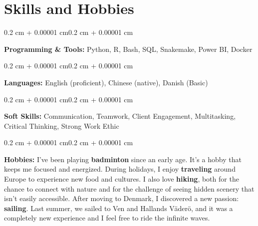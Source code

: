 \documentclass[10pt, letterpaper]{article}
\newenvironment{onecolentry}{
    \begin{adjustwidth}{0.2 cm + 0.00001 cm}{0.2 cm + 0.00001 cm}
}{
    \end{adjustwidth}
}
\begin{document}
    \section{Skills and Hobbies}

        \begin{onecolentry}
            \textbf{Programming \& Tools:} Python, R, Bash, SQL, Snakemake, Power BI, Docker
        \end{onecolentry}

        \vspace{0.2 cm}

        \begin{onecolentry}
            \textbf{Languages:} English (proficient), Chinese (native), Danish (Basic)
        \end{onecolentry}

        \vspace{0.2 cm}

        \begin{onecolentry}
            \textbf{Soft Skills:} Communication, Teamwork, Client Engagement, Multitasking, Critical Thinking, Strong Work Ethic
        \end{onecolentry}

        \vspace{0.2 cm}

        \begin{onecolentry}
            \textbf{Hobbies:}
            I've been playing \textbf{badminton} since an early age. It's a hobby that keeps me focused and energized. During holidays, I enjoy \textbf{traveling} around Europe to experience new food and cultures. I also love \textbf{hiking}, both for the chance to connect with nature and for the challenge of seeing hidden scenery that isn't easily accessible. After moving to Denmark, I discovered a new passion: \textbf{sailing}. Last summer, we sailed to Ven and Hallands Väderö, and it was a completely new experience and I feel free to ride the infinite waves.
        \end{onecolentry}
\end{document}
